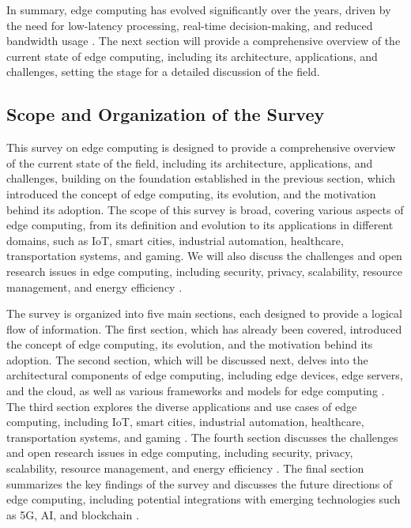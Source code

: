 \documentclass[11pt]{article}
\begin{document}
In summary, edge computing has evolved significantly over the years, driven by the need for low-latency processing, real-time decision-making, and reduced bandwidth usage \cite{ref7}. The next section will provide a comprehensive overview of the current state of edge computing, including its architecture, applications, and challenges, setting the stage for a detailed discussion of the field.

\subsection{Scope and Organization of the Survey}

This survey on edge computing is designed to provide a comprehensive overview of the current state of the field, including its architecture, applications, and challenges, building on the foundation established in the previous section, which introduced the concept of edge computing, its evolution, and the motivation behind its adoption. The scope of this survey is broad, covering various aspects of edge computing, from its definition and evolution to its applications in different domains, such as IoT, smart cities, industrial automation, healthcare, transportation systems, and gaming. We will also discuss the challenges and open research issues in edge computing, including security, privacy, scalability, resource management, and energy efficiency \cite{ref8}.

The survey is organized into five main sections, each designed to provide a logical flow of information. The first section, which has already been covered, introduced the concept of edge computing, its evolution, and the motivation behind its adoption. The second section, which will be discussed next, delves into the architectural components of edge computing, including edge devices, edge servers, and the cloud, as well as various frameworks and models for edge computing \cite{ref9}. The third section explores the diverse applications and use cases of edge computing, including IoT, smart cities, industrial automation, healthcare, transportation systems, and gaming \cite{ref10}. The fourth section discusses the challenges and open research issues in edge computing, including security, privacy, scalability, resource management, and energy efficiency \cite{ref11}. The final section summarizes the key findings of the survey and discusses the future directions of edge computing, including potential integrations with emerging technologies such as 5G, AI, and blockchain \cite{ref12}.
\end{document}
